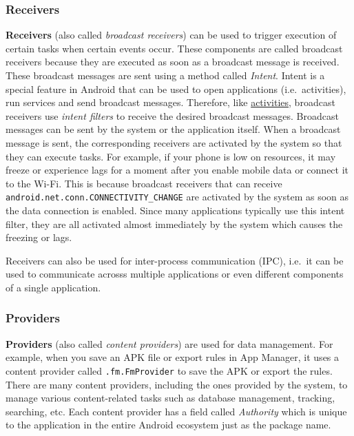 \subsubsection{Receivers}\label{subsubsec:app-details-receivers} %
\textbf{Receivers} (also called \textit{broadcast receivers}) can be used to trigger execution of certain tasks when
certain events occur. These components are called broadcast receivers because they are executed as soon as a broadcast
message is received. These broadcast messages are sent using a method called \textit{Intent}. Intent is a special
feature in Android that can be used to open applications (i.e.\ activities), run services and send broadcast messages.
Therefore, like \hyperref[subsubsec:activities]{activities}, broadcast receivers use \textit{intent filters} to receive
the desired broadcast messages. Broadcast messages can be sent by the system or the application itself. When a broadcast
message is sent, the corresponding receivers are activated by the system so that they can execute tasks. For example, if
your phone is low on resources, it may freeze or experience lags for a moment after you enable mobile data or connect it
to the Wi-Fi. This is because broadcast receivers that can receive \texttt{android.net.conn.CONNECTIVITY\_CHANGE} are
activated by the system as soon as the data connection is enabled. Since many applications typically use this intent
filter, they are all activated almost immediately by the system which causes the freezing or lags.

Receivers can also be used for inter-process communication (IPC), i.e.\ it can be used to communicate acrosss multiple
applications or even different components of a single application.

\subsubsection{Providers}\label{subsubsec:providers} %
\textbf{Providers} (also called \textit{content providers}) are used for data management. For example, when you save an
APK file or export rules in App Manager, it uses a content provider called \texttt{.fm.FmProvider} to save the APK or
export the rules. There are many content providers, including the ones provided by the system, to manage various
content-related tasks such as database management, tracking, searching, etc. Each content provider has a field called
\textit{Authority} which is unique to the application in the entire Android ecosystem just as the package name.

